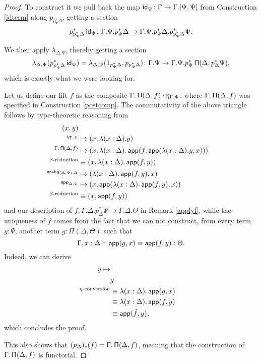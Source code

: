 \begin{proof}
\noindent
  To construct it we pull back the map
  $\operatorname{\mathsf{id}}_{\Psi}\colon\Gamma\rightarrow\Gamma.[\Psi,\Psi]$ from Construction
  \ref{idterm} along $p_{p^*_\Psi\Delta}$, getting a section
  \[p^*_{p^*_\Psi\Delta}\operatorname{\mathsf{id}}_{\Psi}\colon\Gamma.\Psi.p^*_\Psi\Delta\rightarrow\Gamma.\Psi.p^*_\Psi\Delta.p^*_{p^*_\Psi\Delta}\Psi.\]

\noindent
  We then apply $\lambda_{\Delta,\Psi}$, thereby getting a section
  \[\lambda_{\Delta,\Psi}(p^*_{p^*_\Psi\Delta}\operatorname{\mathsf{id}}_\Psi)
    =\lambda_{\Delta,\Psi}(1_{p^*_\Psi\Delta},p_{p^*_\Psi\Delta})
\colon\Gamma.\Psi\rightarrow\Gamma.\Psi.p^*_\Psi\operatorname{\mathsf{\Pi}}(\Delta,p^*_\Delta\Psi),\]
  which is exactly what we were looking for.

  \noindent
  Let us define our lift $\tilde{f}$ as the composite
  $\Gamma.\operatorname{\mathsf{\Pi}}(\Delta,f)\cdot\eta_{\Gamma.\Psi}$, where $\Gamma.\operatorname{\mathsf{\Pi}}(\Delta,f)$
  was specified in Construction \ref{postcomp}. The commutativity of the above
  triangle follows by type-theoretic reasoning from
  \begin{align*}
    (x,y) \\
    ^{\eta_{\Gamma.\Psi}}
    &\mapsto(x,\lambda(x:\Delta).y) \\
    ^{\Gamma.\operatorname{\mathsf{\Pi}}(\Delta,f)}
    &\mapsto(x,\lambda(x:\Delta).\operatorname{\mathsf{app}}(f,\operatorname{\mathsf{app}}(\lambda(x:\Delta).y,x))) \\
    ^{\beta\text{-reduction}}
    &\equiv(x,\lambda(x:\Delta).\operatorname{\mathsf{app}}(f,y)) \\
    ^{\operatorname{\mathsf{exch}}_{\operatorname{\mathsf{\Pi}}(\Delta,\Psi),\Delta}}
    &\mapsto(\lambda(x:\Delta).\operatorname{\mathsf{app}}(f,y),x) \\
    ^{\operatorname{\mathsf{app}}_{\Delta,\Psi}}
    &\mapsto(x,\operatorname{\mathsf{app}}(\lambda(x:\Delta).\operatorname{\mathsf{app}}(f,y),x)) \\
    ^{\beta\text{-reduction}}
    &\equiv(x,\operatorname{\mathsf{app}}(f,y))
  \end{align*}
  and our description of
  $f\colon\Gamma.\Delta.p^*_\Delta\Psi\rightarrow\Gamma.\Delta.\Theta$ in
  Remark \ref{applyf}, while the
  uniqueness of $\tilde{f}$ comes from the fact that we can not construct,
  from every term $y:\Psi$, another term $g:\Pi(\Delta,\Theta)$ such that
  \[\Gamma,x:\Delta\vdash\operatorname{\mathsf{app}}(g,x)\equiv\operatorname{\mathsf{app}}(f,y):\Theta.\]
  Indeed, we can derive
  \begin{align*}
    y\mapsto \\
        & g \\
        ^{\eta\text{-conversion}}&\equiv\lambda(x:\Delta).\operatorname{\mathsf{app}}(g,x) \\
        &\equiv\lambda(x:\Delta).\operatorname{\mathsf{app}}(f,y) \\
        &\equiv\operatorname{\mathsf{app}}(\tilde{f},y),
  \end{align*}
  which concludes the proof.

  \noindent
  This also shows that $(p_{\Delta})_*(f)=\Gamma.\operatorname{\mathsf{\Pi}}(\Delta,f)$, meaning that
  the construction of $\Gamma.\operatorname{\mathsf{\Pi}}(\Delta,f)$ is functorial.
\end{proof}

